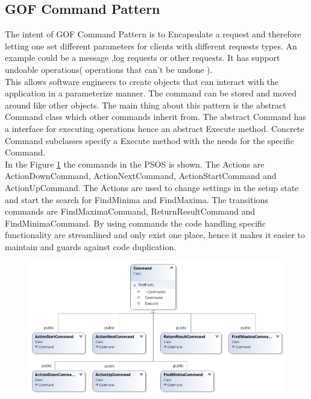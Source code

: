 \subsection{GOF Command Pattern}
The intent of GOF Command Pattern is to Encapsulate a request and therefore letting one set different parameters for clients with different requests types. An example could be a message ,log requests or other requests. It has support undoable operations( operations that can't be undone ).\\

This allows software engineers to create objects that can interact with the application in a parameterize manner. The command can be stored and moved around like other objects. The main thing about this pattern is the abstract Command class which other commands inherit from. The abstract Command has a interface for executing operations hence an abstract Execute method. Concrete Command subclasses specify a Execute method with the needs for the specific Command. \\
 
In the Figure \ref{fig:commands} the commands in the PSOS is shown. The Actions are ActionDownCommand, ActionNextCommand, ActionStartCommand and ActionUpCommand. The Actions are used to change settings in the setup state and start the search for FindMinima and FindMaxima. The transitions commands are FindMaximaCommand, ReturnResultCommand and FindMinimaCommand. By using commands the code handling specific functionality are streamlined and only exist one place, hence it makes it easier to maintain and guards against code duplication.
\begin{figure}[h]
	\centering
	\includegraphics[width=1\linewidth]{diagram/Commands}
	\caption[The commands used to control actions and transitions]{}
	\label{fig:commands}
\end{figure}

